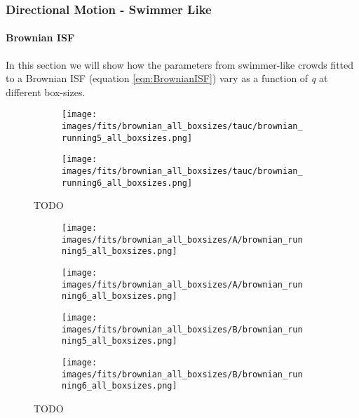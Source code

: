 \documentclass[10pt]{article}
\begin{document}
\subsubsection{Directional Motion - Swimmer Like}
\paragraph{Brownian ISF} In this section we will show how the parameters from swimmer-like crowds fitted to a Brownian ISF (equation \ref{eqn:BrownianISF}) vary as a function of \textit{q} at different box-sizes. 
\begin{figure}[H]
\begin{subfigure}[t]{\textwidth}
  \centering
 \texttt{[image: images/fits/brownian\_all\_boxsizes/tauc/brownian\_running5\_all\_boxsizes.png]}
  \caption{}
\end{subfigure}%
\hfill
\begin{subfigure}[t]{\textwidth}
  \centering
  \texttt{[image: images/fits/brownian\_all\_boxsizes/tauc/brownian\_running6\_all\_boxsizes.png]}
  \caption{}
\end{subfigure}
\caption{TODO}
\label{fig:running_brownian_fits_tauc_all_boxsizes}
\end{figure}

\begin{figure}[H]
\begin{subfigure}[t]{.5\textwidth}
  \centering
 \texttt{[image: images/fits/brownian\_all\_boxsizes/A/brownian\_running5\_all\_boxsizes.png]}
  \caption{}
\end{subfigure}%
\hfill
\begin{subfigure}[t]{.5\textwidth}
  \centering
  \texttt{[image: images/fits/brownian\_all\_boxsizes/A/brownian\_running6\_all\_boxsizes.png]}
  \caption{}
\end{subfigure}
\label{fig:running_brownian_fits_A_all_boxsizes}
\par\bigskip
\begin{subfigure}[t]{.5\textwidth}
  \centering
 \texttt{[image: images/fits/brownian\_all\_boxsizes/B/brownian\_running5\_all\_boxsizes.png]}
  \caption{}
\end{subfigure}%
\hfill
\begin{subfigure}[t]{.5\textwidth}
  \centering
  \texttt{[image: images/fits/brownian\_all\_boxsizes/B/brownian\_running6\_all\_boxsizes.png]}
  \caption{}
\end{subfigure}
\caption{TODO}
\label{fig:running_brownian_fits_tauc_B_boxsizes}
\end{figure}
\end{document}
